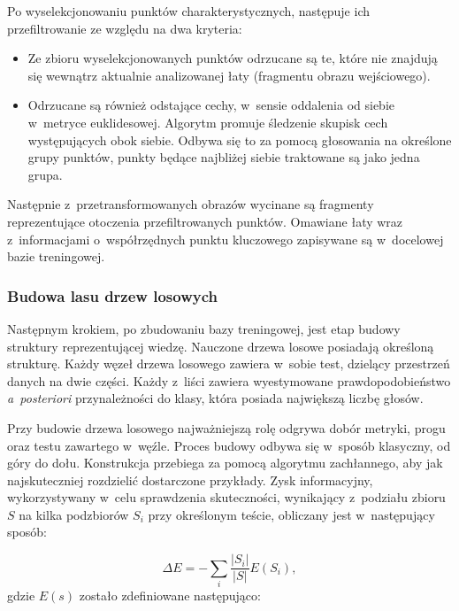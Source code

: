         Po wyselekcjonowaniu punktów charakterystycznych, następuje ich przefiltrowanie ze względu na dwa kryteria:

          \begin{itemize}
            \item Ze zbioru wyselekcjonowanych punktów odrzucane są te, które nie znajdują się wewnątrz aktualnie analizowanej łaty (fragmentu obrazu wejściowego).
            \item Odrzucane są również odstające cechy, w~sensie oddalenia od siebie w~metryce euklidesowej. Algorytm promuje śledzenie skupisk cech występujących obok siebie. Odbywa się to za pomocą głosowania na określone grupy punktów, punkty będące najbliżej siebie traktowane są jako jedna grupa.
          \end{itemize}

        Następnie z~przetransformowanych obrazów wycinane są fragmenty reprezentujące otoczenia przefiltrowanych punktów. Omawiane łaty wraz z~informacjami o~współrzędnych punktu kluczowego zapisywane są w~docelowej bazie treningowej.

      \subsubsection{Budowa lasu drzew losowych}
        Następnym krokiem, po zbudowaniu bazy treningowej, jest etap budowy struktury reprezentującej wiedzę. Nauczone drzewa losowe posiadają określoną strukturę. Każdy węzeł drzewa losowego zawiera w~sobie test, dzielący przestrzeń danych na dwie części. Każdy z~liści zawiera wyestymowane prawdopodobieństwo \textit{a~posteriori} przynależności do klasy, która posiada największą liczbę głosów.

        Przy budowie drzewa losowego najważniejszą rolę odgrywa dobór metryki, progu oraz testu zawartego w~węźle. Proces budowy odbywa się w~sposób klasyczny, od góry do dołu. Konstrukcja przebiega za pomocą algorytmu zachłannego, aby jak najskuteczniej rozdzielić dostarczone przykłady. Zysk informacyjny, wykorzystywany w~celu sprawdzenia skuteczności, wynikający z~podziału zbioru $S$ na kilka podzbiorów $S_i$ przy określonym teście, obliczany jest w~następujący sposób:

          \begin{equation}
              \Delta E = - \sum\limits_{i} \frac{|S_{i}|}{|S|} E(S_{i}),
          \end{equation}
        gdzie $E(s)$ zostało zdefiniowane następująco:

